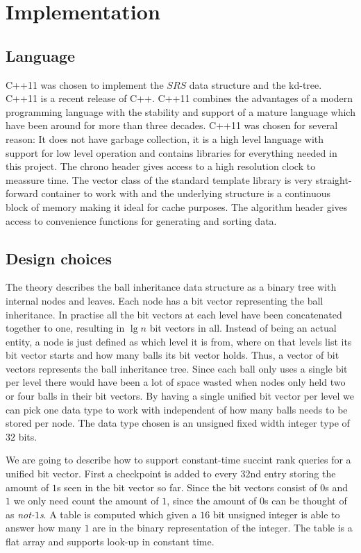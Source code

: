 \chapter{Implementation}

\section{Language}

C++11 was chosen to implement the $SRS$ data structure and the kd-tree. C++11 is a recent release of C++. C++11 combines the advantages of a modern programming language with the stability and support of a mature language which have been around for more than three decades. C++11 was chosen for several reason: It does not have garbage collection, it is a high level language with support for low level operation and contains libraries for everything needed in this project. The chrono header gives access to a high resolution clock to meassure time. The vector class of the standard template library is very straight-forward container to work with and the underlying structure is a continuous block of memory making it ideal for cache purposes. The algorithm header gives access to convenience functions for generating and sorting data.

\section{Design choices}

The theory describes the ball inheritance data structure as a binary tree with internal nodes and leaves. Each node has a bit vector representing the ball inheritance. In practise all the bit vectors at each level have been concatenated together to one, resulting in $\lg n$ bit vectors in all. Instead of being an actual entity, a node is just defined as which level it is from, where on that levels list its bit vector starts and how many balls its bit vector holds. Thus, a vector of bit vectors represents the ball inheritance tree. Since each ball only uses a single bit per level there would have been a lot of space wasted when nodes only held two or four balls in their bit vectors. By having a single unified bit vector per level we can pick one data type to work with independent of how many balls needs to be stored per node. The data type chosen is an unsigned fixed width integer type of $32$ bits.

We are going to describe how to support constant-time succint rank queries for a unified bit vector. First a checkpoint is added to every 32nd entry storing the amount of $1$s seen in the bit vector so far. Since the bit vectors consist of $0$s and $1$ we only need count the amount of $1$, since the amount of $0$s can be thought of as \emph{not-$1$s}. A table is computed which given a $16$ bit unsigned integer is able to answer how many $1$ are in the binary representation of the integer. The table is a flat array and supports look-up in constant time.

